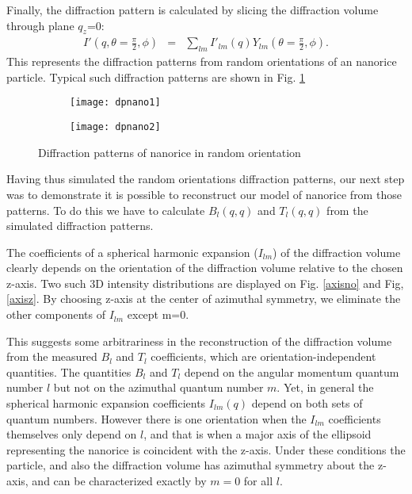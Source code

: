 Finally, the diffraction pattern is calculated by slicing the diffraction volume through plane $q_z$=0:
\begin{eqnarray}
I'(q,\theta=\frac{\pi}{2},\phi)&=& \sum_{lm} I'_{lm}(q) Y_{lm}^{}(\theta=\frac{\pi}{2},\phi). 
\end{eqnarray}
This represents the diffraction patterns from random orientations of an nanorice particle. Typical such diffraction patterns are shown in Fig. \ref{fig:dpnano}
\begin{figure}[h]
\begin{subfigure}{.5\textwidth}
  \centering
  \texttt{[image: dpnano1]}
\end{subfigure}
\begin{subfigure}{.5\textwidth}
  \centering
  \texttt{[image: dpnano2]}
\end{subfigure}
\caption{Diffraction patterns of nanorice in random orientation}
\label{fig:dpnano}
\end{figure}

Having thus simulated the random orientations diffraction patterns, our next step was to demonstrate it is possible to reconstruct our model of nanorice from those patterns. To do this we have to calculate $B_{l}(q,q)$ and $T_{l}(q,q)$ from the simulated diffraction patterns.

The coefficients of a spherical harmonic expansion ($I_{lm}$) of the diffraction volume clearly depends on the orientation of the diffraction volume relative to the chosen z-axis. Two such 3D intensity distributions are displayed on Fig. \ref{axisno} and Fig, \ref{axisz}. By choosing z-axis at the center of azimuthal symmetry, we eliminate the other components of $I_{lm}$ except m=0.

This suggests some arbitrariness in the reconstruction of the diffraction volume from the measured $B_l$ and $T_l$ coefficients, which are orientation-independent quantities. The quantities $B_l$ and $T_l$ depend on the angular momentum quantum number $l$ but not on the azimuthal quantum number $m$. Yet, in general the spherical harmonic expansion coefficients $I_{lm}(q)$ depend on both sets of quantum numbers. However there is one orientation when the $I_{lm}$ coefficients themselves only depend on $l$, and that is when a major axis of the ellipsoid representing the nanorice is coincident with the z-axis. Under these conditions the particle, and also the diffraction volume has azimuthal symmetry about the z-axis, and can be characterized exactly by $m=0$ for all $l$.

